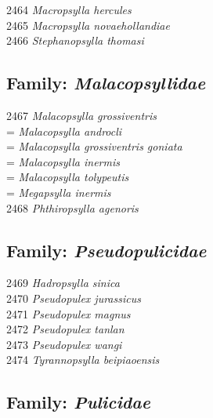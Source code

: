 \documentclass[
]{article}
\begin{document}
2464 \emph{Macropsylla hercules}\\
2465 \emph{Macropsylla novaehollandiae}\\
2466 \emph{Stephanopsylla thomasi}

\hypertarget{family-malacopsyllidae}{%
\subsection{\texorpdfstring{Family:
\emph{Malacopsyllidae}}{Family: Malacopsyllidae}}\label{family-malacopsyllidae}}

2467 \emph{Malacopsylla grossiventris}\\
= \emph{Malacopsylla androcli}\\
= \emph{Malacopsylla grossiventris goniata}\\
= \emph{Malacopsylla inermis}\\
= \emph{Malacopsylla tolypeutis}\\
= \emph{Megapsylla inermis}\\
2468 \emph{Phthiropsylla agenoris}

\hypertarget{family-pseudopulicidae}{%
\subsection{\texorpdfstring{Family:
\emph{Pseudopulicidae}}{Family: Pseudopulicidae}}\label{family-pseudopulicidae}}

2469 \emph{Hadropsylla sinica}\\
2470 \emph{Pseudopulex jurassicus}\\
2471 \emph{Pseudopulex magnus}\\
2472 \emph{Pseudopulex tanlan}\\
2473 \emph{Pseudopulex wangi}\\
2474 \emph{Tyrannopsylla beipiaoensis}

\hypertarget{family-pulicidae}{%
\subsection{\texorpdfstring{Family:
\emph{Pulicidae}}{Family: Pulicidae}}\label{family-pulicidae}}
\end{document}
